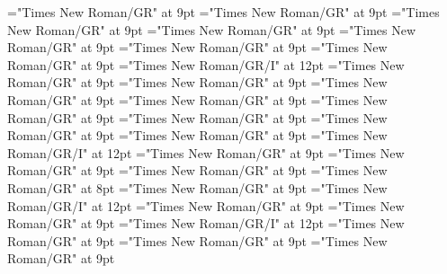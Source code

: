 \documentclass[gps1,twoside]{article}
\begin{document}
\font\spanspanpartofspeechmorphosyntaxanalysissharedgrammaticalinfosensesentrybefore="Times New Roman/GR" at 9pt
\font\spanpartofspeechmorphosyntaxanalysissharedgrammaticalinfosensesentrylastchildafter="Times New Roman/GR" at 9pt
\font\spanspanslotsmorphosyntaxanalysissharedgrammaticalinfosensesentrybefore="Times New Roman/GR" at 9pt
\font\slotsmorphosyntaxanalysissharedgrammaticalinfosensesentrybefore="Times New Roman/GR" at 9pt
\font\spanspannameslotslotsmorphosyntaxanalysissharedgrammaticalinfosensesentrybefore="Times New Roman/GR" at 9pt
\font\spannameslotslotsmorphosyntaxanalysissharedgrammaticalinfosensesentrylastchildafter="Times New Roman/GR" at 9pt
\font\morphosyntaxanalysissensesensesentryafter="Times New Roman/GR" at 9pt
\font\morphosyntaxanalysissensesensesentry="Times New Roman/GR/I" at 12pt
\font\spanspanpartofspeechmorphosyntaxanalysissensesensesentrybefore="Times New Roman/GR" at 9pt
\font\spanpartofspeechmorphosyntaxanalysissensesensesentrylastchildafter="Times New Roman/GR" at 9pt
\font\spanspanslotsmorphosyntaxanalysissensesensesentrybefore="Times New Roman/GR" at 9pt
\font\slotsmorphosyntaxanalysissensesensesentrybefore="Times New Roman/GR" at 9pt
\font\spanspannameslotslotsmorphosyntaxanalysissensesensesentrybefore="Times New Roman/GR" at 9pt
\font\spannameslotslotsmorphosyntaxanalysissensesensesentrylastchildafter="Times New Roman/GR" at 9pt
\font\sensetypesensesensesentrybefore="Times New Roman/GR" at 9pt
\font\sensetypesensesensesentryafter="Times New Roman/GR" at 9pt
\font\sensetypesensesensesentry="Times New Roman/GR/I" at 12pt
\font\spanspanabbreviationsensetypesensesensesentrybefore="Times New Roman/GR" at 9pt
\font\spanspandefinitionorglosssensesensesentrybefore="Times New Roman/GR" at 9pt
\font\spandefinitionorglosssensesensesentrylastchildafter="Times New Roman/GR" at 9pt
\font\exampleexampleexamplessensesensesentrybefore="Times New Roman/GR" at 8pt
\font\examplessensesensesentryafter="Times New Roman/GR" at 9pt
\font\spanbzhexampleexampleexamplessensesensesentry="Times New Roman/GR/I" at 12pt
\font\spanspanexampleexampleexamplessensesensesentrybefore="Times New Roman/GR" at 9pt
\font\spanexampleexampleexamplessensesensesentrylastchildafter="Times New Roman/GR" at 9pt
\font\spanexampleexampleexamplessensesensesentry="Times New Roman/GR/I" at 12pt
\font\spanspantranslationtranslationtranslationsexampleexamplessensesensesentrybefore="Times New Roman/GR" at 9pt
\font\spantranslationtranslationtranslationsexampleexamplessensesensesentrylastchildafter="Times New Roman/GR" at 9pt
\font\spanspanencyclopedicinfosensesensesentrybefore="Times New Roman/GR" at 9pt
\end{document}
